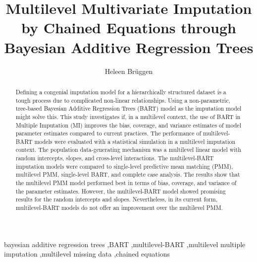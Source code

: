\documentclass[3p,12pt,a4paper]{elsarticle}
\begin{document}
\begin{frontmatter}
\title{Multilevel Multivariate Imputation by Chained Equations through Bayesian Additive Regression Trees}

\author[1]{Heleen Brüggen}



\begin{abstract}
    Defining a congenial imputation model for a hierarchically structured dataset is a tough process due to complicated non-linear relationships. Using a non-parametric, tree-based Bayesian Additive Regression Trees (BART) model as the imputation model might solve this. This study investigates if, in a multilevel context, the use of BART in Multiple Imputation (MI) improves the bias, coverage, and variance estimates of model parameter estimates compared to current practices. The performance of multilevel-BART models were evaluated with a statistical simulation in a multilevel imputation context. The population data-generating mechanism was a multilevel linear model with random intercepts, slopes, and cross-level interactions. The multilevel-BART imputation models were compared to single-level predictive mean matching (PMM), multilevel PMM, single-level BART, and complete case analysis. The results show that the multilevel PMM model performed best in terms of bias, coverage, and variance of the parameter estimates. However, the multilevel-BART model showed promising results for the random intercepts and slopes. Nevertheless, in its current form, multilevel-BART models do not offer an improvement over the multilevel PMM.
\end{abstract}

\begin{keyword} 
    bayesian additive regression trees \sep BART \sep multilevel-BART \sep multilevel multiple imputation \sep multilevel missing data \sep chained equations
\end{keyword}
\end{frontmatter}
\end{document}
